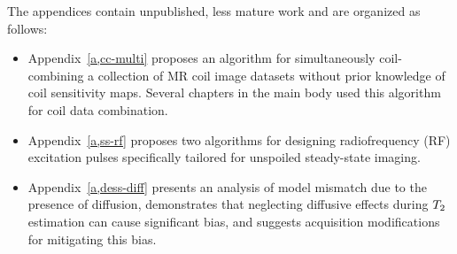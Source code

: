 \vspace{0.5em}
{\setlength{\parindent}{0ex}
The appendices contain unpublished, less mature work
and are organized as follows:}
\begin{itemize}
	\setlength\itemsep{0.5em}
	\item{%
		Appendix~\ref{a,cc-multi} proposes an algorithm
		for simultaneously coil-combining 
		a collection of MR coil image datasets
		without prior knowledge 
		of coil sensitivity maps.
		Several chapters in the main body 
		used this algorithm for coil data combination.
	}%
	\item{%
		Appendix~\ref{a,ss-rf} proposes two algorithms
		for designing radiofrequency (RF) excitation pulses
		specifically tailored for unspoiled steady-state imaging.
	}%
	\item{%
		Appendix~\ref{a,dess-diff} presents an analysis
		of model mismatch due to the presence of diffusion,
		demonstrates that neglecting diffusive effects
		during $T_2$ estimation 
		can cause significant bias,
		and suggests acquisition modifications
		for mitigating this bias.
	}%
\end{itemize}
